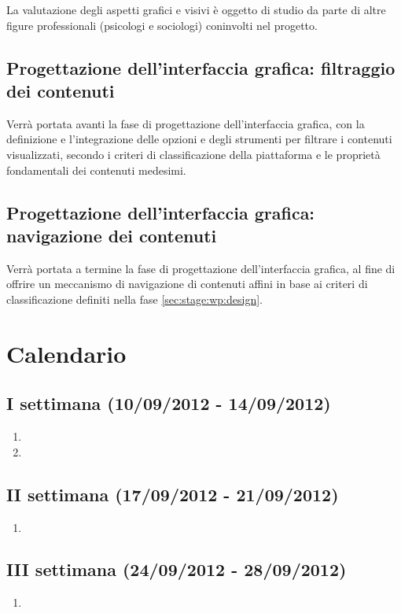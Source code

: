 \documentclass[10pt,a4paper,hidelinks]{scrartcl} %
\begin{document}
	La valutazione degli aspetti grafici e visivi è oggetto di studio da parte di altre figure professionali (psicologi e sociologi) coninvolti nel progetto.

	\subsection{Progettazione dell'interfaccia grafica: filtraggio dei contenuti}
	\label{sec:stage:wp:ui:design:filter}
	Verrà portata avanti la fase di progettazione dell'interfaccia grafica, con la definizione e l'integrazione delle opzioni e degli strumenti per filtrare i contenuti visualizzati, secondo i criteri di classificazione della piattaforma e le proprietà fondamentali dei contenuti medesimi.

	\subsection{Progettazione dell'interfaccia grafica: navigazione dei contenuti}
	\label{sec:stage:wp:ui:design:nav}
	Verrà portata a termine la fase di progettazione dell'interfaccia grafica, al fine di offrire un meccanismo di navigazione di contenuti affini in base ai criteri di classificazione definiti nella fase \ref{sec:stage:wp:design}.

	\newpage
	\section{Calendario}
	
	\subsection*{I settimana (10/09/2012 - 14/09/2012)}
	\begin{enumerate}
	\item {}
	\item {}
	\end{enumerate}
	\subsection*{II settimana (17/09/2012 - 21/09/2012)}
	\begin{enumerate}
	\item {}
	\end{enumerate}
	\subsection*{III settimana (24/09/2012 - 28/09/2012)}
	\begin{enumerate}
	\item {}
	\end{enumerate}
\end{document}
